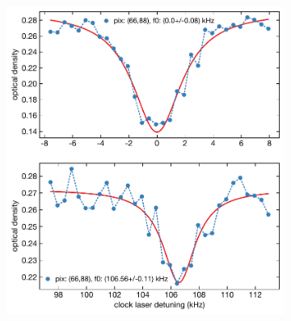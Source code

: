 \documentclass[bibnotes]{article}
\begin{document}

			\begin{figure}
			\centering 
			\begin{subfigure}[b]{0.4\linewidth}
				\includegraphics[scale=0.5]{figures/high_depth66_88.pdf}
				\caption{}
			\end{subfigure}
			\qquad\qquad
			\begin{subfigure}[b]{0.4\linewidth}

\end{subfigure}
\end{figure}
\end{document}
